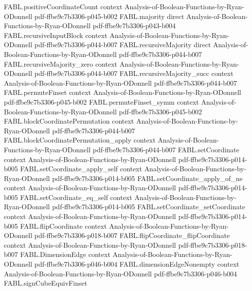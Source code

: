 \begin{theorem}
\proofstep
  {FABL.positiveCoordinateCount}
  {context}
  {Analysis-of-Boolean-Functions-by-Ryan-ODonnell}
  {pdf-ffbe9c7b3306-p045-b002}
\proofstep
  {FABL.majority}
  {direct}
  {Analysis-of-Boolean-Functions-by-Ryan-ODonnell}
  {pdf-ffbe9c7b3306-p043-b004}
\proofstep
  {FABL.recursiveInputBlock}
  {context}
  {Analysis-of-Boolean-Functions-by-Ryan-ODonnell}
  {pdf-ffbe9c7b3306-p044-b007}
\proofstep
  {FABL.recursiveMajority}
  {direct}
  {Analysis-of-Boolean-Functions-by-Ryan-ODonnell}
  {pdf-ffbe9c7b3306-p044-b007}
\proofstep
  {FABL.recursiveMajority_zero}
  {context}
  {Analysis-of-Boolean-Functions-by-Ryan-ODonnell}
  {pdf-ffbe9c7b3306-p044-b007}
\proofstep
  {FABL.recursiveMajority_succ}
  {context}
  {Analysis-of-Boolean-Functions-by-Ryan-ODonnell}
  {pdf-ffbe9c7b3306-p044-b007}
\proofstep
  {FABL.permuteFinset}
  {context}
  {Analysis-of-Boolean-Functions-by-Ryan-ODonnell}
  {pdf-ffbe9c7b3306-p045-b002}
\proofstep
  {FABL.permuteFinset_symm}
  {context}
  {Analysis-of-Boolean-Functions-by-Ryan-ODonnell}
  {pdf-ffbe9c7b3306-p045-b002}
\proofstep
  {FABL.blockCoordinatePermutation}
  {context}
  {Analysis-of-Boolean-Functions-by-Ryan-ODonnell}
  {pdf-ffbe9c7b3306-p044-b007}
\proofstep
  {FABL.blockCoordinatePermutation_apply}
  {context}
  {Analysis-of-Boolean-Functions-by-Ryan-ODonnell}
  {pdf-ffbe9c7b3306-p044-b007}
\proofstep
  {FABL.setCoordinate}
  {context}
  {Analysis-of-Boolean-Functions-by-Ryan-ODonnell}
  {pdf-ffbe9c7b3306-p014-b005}
\proofstep
  {FABL.setCoordinate_apply_self}
  {context}
  {Analysis-of-Boolean-Functions-by-Ryan-ODonnell}
  {pdf-ffbe9c7b3306-p014-b005}
\proofstep
  {FABL.setCoordinate_apply_of_ne}
  {context}
  {Analysis-of-Boolean-Functions-by-Ryan-ODonnell}
  {pdf-ffbe9c7b3306-p014-b005}
\proofstep
  {FABL.setCoordinate_eq_self}
  {context}
  {Analysis-of-Boolean-Functions-by-Ryan-ODonnell}
  {pdf-ffbe9c7b3306-p014-b005}
\proofstep
  {FABL.setCoordinate_setCoordinate}
  {context}
  {Analysis-of-Boolean-Functions-by-Ryan-ODonnell}
  {pdf-ffbe9c7b3306-p014-b005}
\proofstep
  {FABL.flipCoordinate}
  {context}
  {Analysis-of-Boolean-Functions-by-Ryan-ODonnell}
  {pdf-ffbe9c7b3306-p018-b007}
\proofstep
  {FABL.flipCoordinate_flipCoordinate}
  {context}
  {Analysis-of-Boolean-Functions-by-Ryan-ODonnell}
  {pdf-ffbe9c7b3306-p018-b007}
\proofstep
  {FABL.DimensionEdge}
  {context}
  {Analysis-of-Boolean-Functions-by-Ryan-ODonnell}
  {pdf-ffbe9c7b3306-p046-b004}
\proofstep
  {FABL.dimensionEdgeNonempty}
  {context}
  {Analysis-of-Boolean-Functions-by-Ryan-ODonnell}
  {pdf-ffbe9c7b3306-p046-b004}
\proofstep
  {FABL.signCubeEquivFinset}

\end{theorem}
